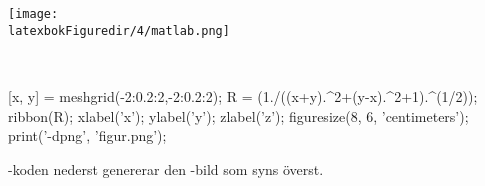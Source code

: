 \documentclass[10pt,../../a4.tex]{subfiles}
\begin{document}
\begin{kod}[p]
	\centering
	\begin{minipage}{\textwidth}
		\centering
		\texttt{[image: \\latexbokFiguredir/4/matlab.png]}
	\end{minipage}
	\\[2ex]
	\begin{minipage}{\textwidth}
		\begin{matlabcode}
[x, y] = meshgrid(-2:0.2:2,-2:0.2:2);
R = (1./((x+y).^2+(y-x).^2+1).^(1/2));
ribbon(R);
xlabel('x'); ylabel('y'); zlabel('z');
figuresize(8, 6, 'centimeters');
print('-dpng', 'figur.png');
		\end{matlabcode}
	\end{minipage}
	\caption{\MATLAB-koden nederst genererar den \PNG-bild som
	syns överst.}
	\label{ex:matlab:png}
\end{kod}

\label{sec:4:end}
\end{document}
